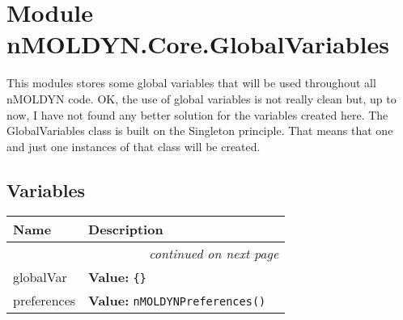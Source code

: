 %
%
%


\section{Module nMOLDYN.Core.GlobalVariables}

    \label{nMOLDYN:Core:GlobalVariables}
This modules stores some global variables that will be used throughout all 
nMOLDYN code. OK, the use of global variables is not really clean but, up 
to now, I have not found any better solution for the variables created 
here. The GlobalVariables class is built on the Singleton principle. That 
means that one and just one instances of that class will be created.



  \subsection{Variables}

    \vspace{-1cm}
\hspace{\varindent}\begin{longtable}{|p{\varnamewidth}|p{\vardescrwidth}|l}
\cline{1-2}
\cline{1-2} \centering \textbf{Name} & \centering \textbf{Description}& \\
\cline{1-2}
\endhead\cline{1-2}\multicolumn{3}{r}{\small\textit{continued on next page}}\\\endfoot\cline{1-2}
\endlastfoot\raggedright g\-l\-o\-b\-a\-l\-V\-a\-r\- & \raggedright \textbf{Value:} 
{\tt \{\}}&\\
\cline{1-2}
\raggedright p\-r\-e\-f\-e\-r\-e\-n\-c\-e\-s\- & \raggedright \textbf{Value:} 
{\tt nMOLDYNPreferences()}&\\
\cline{1-2}
\end{longtable}


